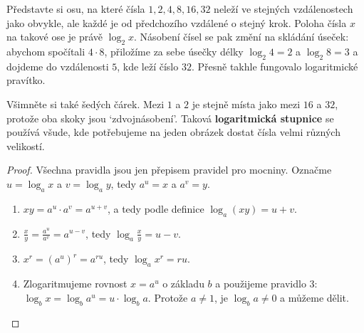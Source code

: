 Představte si osu, na které čísla $1, 2, 4, 8, 16, 32$ neleží ve stejných vzdálenostech jako obvykle, ale každé je od předchozího vzdálené o stejný krok. Poloha čísla $x$ na takové ose je právě $\log_2 x$. Násobení čísel se pak změní na skládání úseček: abychom spočítali $4\cdot 8$, přiložíme za sebe úsečky délky $\log_2 4 = 2$ a $\log_2 8 = 3$ a dojdeme do vzdálenosti $5$, kde leží číslo $32$. Přesně takhle fungovalo logaritmické pravítko.

\begin{center}
\end{center}

Všimněte si také šedých čárek. Mezi $1$ a $2$ je stejně místa jako mezi $16$ a $32$, protože oba skoky jsou `zdvojnásobení'. Taková \textbf{logaritmická stupnice} se používá všude, kde potřebujeme na jeden obrázek dostat čísla velmi různých velikostí.

\begin{proof}
  Všechna pravidla jsou jen přepisem pravidel pro mocniny. Označme $u = \log_a x$ a $v = \log_a y$, tedy $a^u = x$ a $a^v = y$.
  \begin{enumerate}
    \item $xy = a^u\cdot a^v = a^{u + v}$, a tedy podle definice $\log_a(xy) = u + v$.
    \item $\frac{x}{y} = \frac{a^u}{a^v} = a^{u - v}$, tedy $\log_a\frac{x}{y} = u - v$.
    \item $x^r = {(a^u)}^r = a^{ru}$, tedy $\log_a x^r = ru$.
    \item Zlogaritmujeme rovnost $x = a^u$ o základu $b$ a použijeme pravidlo 3: $\log_b x = \log_b a^u = u\cdot\log_b a$. Protože $a\neq 1$, je $\log_b a\neq 0$ a můžeme dělit.
  \end{enumerate}
\end{proof}

